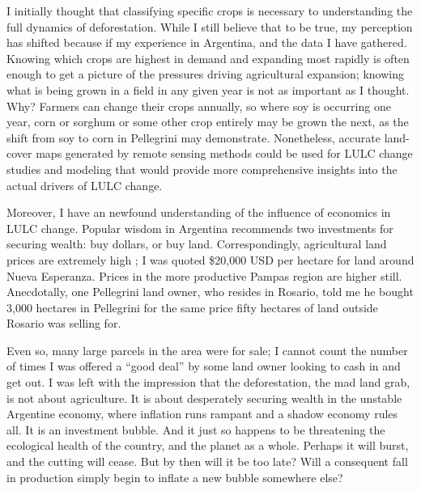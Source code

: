 I initially thought that classifying specific crops is necessary to understanding the full dynamics of deforestation. While I still believe that to be true, my perception has shifted because if my experience in Argentina, and the data I have gathered. Knowing which crops are highest in demand and expanding most rapidly is often enough to get a picture of the pressures driving agricultural expansion; knowing what is being grown in a field in any given year is not as important as I thought. Why? Farmers can change their crops annually, so where soy is occurring one year, corn or sorghum or some other crop entirely may be grown the next, as the shift from soy to corn in Pellegrini may demonstrate. Nonetheless, accurate land-cover maps generated by remote sensing methods could be used for LULC change studies and modeling that would provide more comprehensive insights into the actual drivers of LULC change.

Moreover, I have an newfound understanding of the influence of economics in LULC change. Popular wisdom in Argentina recommends two investments for securing wealth: buy dollars, or buy land. Correspondingly, agricultural land prices are extremely high \autocite{mercopress2010prime}; I was quoted \$20,000 USD per hectare for land around Nueva Esperanza. Prices in the more productive Pampas region are higher still. Anecdotally, one Pellegrini land owner, who resides in Rosario, told me he bought 3,000 hectares in Pellegrini for the same price fifty hectares of land outside Rosario was selling for.

Even so, many large parcels in the area were for sale; I cannot count the number of times I was offered a ``good deal'' by some land owner looking to cash in and get out. I was left with the impression that the deforestation, the mad land grab, is not about agriculture. It is about desperately securing wealth in the unstable Argentine economy, where inflation runs rampant and a shadow economy rules all. It is an investment bubble. And it just so happens to be threatening the ecological health of the country, and the planet as a whole. Perhaps it will burst, and the cutting will cease. But by then will it be too late? Will a consequent fall in production simply begin to inflate a new bubble somewhere else?
